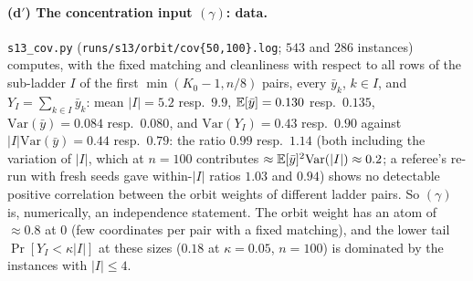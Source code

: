 \paragraph{(d$'$) The concentration input $(\gamma)$: data.}
\texttt{s13\_cov.py} (\texttt{runs/s13/orbit/cov\{50,100\}.log}; $543$ and
$286$ instances) computes, with the fixed matching and cleanliness with
respect to all rows of the sub-ladder $I$ of the first
$\min(K_0-1,n/8)$ pairs, every $\bar y_k$, $k\in I$, and
$Y_I=\sum_{k\in I}\bar y_k$: mean $|I|=5.2$ resp.\ $9.9$,
$\mathbb{E}[\bar y]=0.130$ resp.\ $0.135$, $\mathrm{Var}(\bar y)=0.084$ resp.\
$0.080$, and $\mathrm{Var}(Y_I)=0.43$ resp.\ $0.90$ against
$|I|\mathrm{Var}(\bar y)=0.44$ resp.\ $0.79$: the ratio $0.99$ resp.\
$1.14$ (both including the variation of $|I|$, which at $n=100$
contributes $\approx\mathbb{E}[\bar y]^2\mathrm{Var}(|I|)\approx0.2$; a
referee's re-run with fresh seeds gave within-$|I|$ ratios $1.03$ and
$0.94$) shows no detectable positive correlation between the orbit
weights of different ladder pairs.  So $(\gamma)$ is, numerically, an
independence statement.  The orbit weight has an atom of $\approx0.8$
at $0$ (few coordinates per pair with a fixed matching), and the lower
tail $\Pr[Y_I<\kappa|I|]$ at these sizes ($0.18$ at $\kappa=0.05$,
$n=100$) is dominated by the instances with $|I|\le4$.

